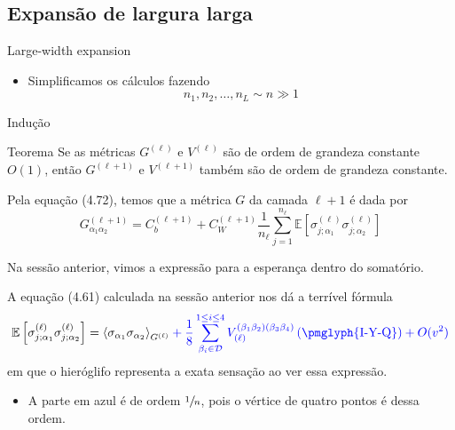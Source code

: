 \documentclass{beamer}
\newcommand{\EE}{\mathbb{E}}
\def\mi#1{{\alpha_{#1}}}
\def\mj#1{\beta_{#1}}
\def\eell{{(\ell)}}
\def\eellum{{(\ell+1)}}
\newcommand{\Gnormal}[3]{{G^{(#1)}_{\mi{#2}\mi{#3}}}}
\newcommand{\Verticeinvb}[5]{V_{(#1)}^{(\mj#2\mj#3)(\mj#4\mj#5)}}
\newcommand{\Expectation}[2]{\left\langle #1 \right\rangle_{#2}}
\begin{document}
\subsection{Expansão de largura larga}

\begin{frame}{Large-width expansion}
	\begin{itemize}
		\item Simplificamos os cálculos fazendo 
		\begin{equation*}\tag{4.84}
			n_1, n_2, \ldots, n_L \sim n \gg 1 
		\end{equation*} 
	\end{itemize}
\end{frame}

\begin{frame}{Indução}
	\begin{block}{Teorema}
		Se as métricas $G^\eell$ e $V^\eell$ são de ordem de grandeza constante $O(1)$, então $G^\eellum$ e $V^\eellum$ também são de ordem de grandeza constante.
	\end{block}
\end{frame}

\begin{frame}
	Pela equação (4.72), temos que a métrica $G$ da camada $\ell+1$ é dada por
	\begin{equation*}
		\Gnormal{\ell+1}12 = C_b^\eellum + C_W^\eellum\frac{1}{n_\ell}\sum_{j=1}^{n_\ell}  \EE\left[\sigma_{j;\mi1}^\eell\sigma_{j;\mi2}^\eell\right]
	\end{equation*}

	Na sessão anterior, vimos a expressão para a esperança dentro do somatório.
\end{frame}

\begin{frame}
	A equação (4.61) calculada na sessão anterior nos dá a terrível fórmula 
	{\small
	\begin{multline*}
		\EE\left[\sigma_{j;\mi1}^\eell\sigma_{j;\mi2}^\eell\right] = \Expectation{\sigma_\mi1\sigma_\mi2}{G^\eell}  \color{blue} + \frac{1}{8} \sum_{\mj{i}\in\mathcal{D}}^{1\le i \le 4}\Verticeinvb{\ell}1234\left( \text{\pmglyph{I-Y-Q}} \right) + O(v^2)
	\end{multline*}
	}
	em que o hieróglifo  representa a exata sensação ao ver essa expressão. 
	\medskip
	\begin{itemize}
		\item 	A parte em azul é de ordem $\sfrac{1}{n}$, pois o vértice de quatro pontos é dessa ordem.
	\end{itemize}
\end{frame}
\end{document}

